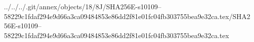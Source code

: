 ../../../.git/annex/objects/18/8J/SHA256E-s10109--58229c1fdaf294e9d66a3ca09484853e86dd2f81e01fc04fb303755bea9e32ca.tex/SHA256E-s10109--58229c1fdaf294e9d66a3ca09484853e86dd2f81e01fc04fb303755bea9e32ca.tex